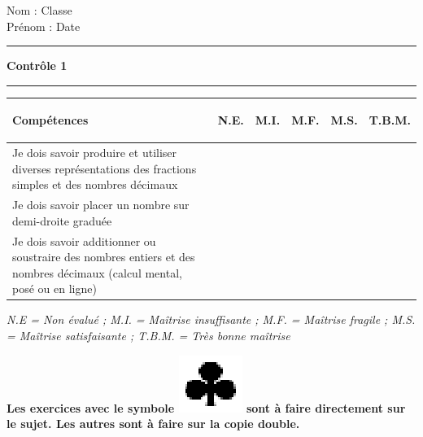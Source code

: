 \documentclass[a4paper,11pt]{article}
\newcommand{\titre}[5] 
{
\noindent #2 \hfill #4 \\
#3 \hfill #5

\vspace{-1.6cm}

\begin{center}\rule{6cm}{0.5mm}\end{center}
\vspace{0.2cm}
\begin{center}{\large{\textbf{#1}}}\end{center}
\begin{center}\rule{6cm}{0.5mm}\end{center}
}
\begin{document}
\pagestyle{empty}
\titre{Contrôle 1  }{Nom :}{Prénom :}{Classe}{Date}


\vspace*{0.25cm}
\begin{flushleft}
\begin{tabular}{|m{9.5cm}|m{1.25cm}|m{1.25cm}|m{1.25cm}|m{1.25cm}|m{1.25cm}|}
\hline 
\textbf{Compétences} & \begin{center}
\textbf{N.E.}
\end{center} & \begin{center}
\textbf{M.I.}
\end{center} & \begin{center}
\textbf{M.F.}
\end{center}  & \begin{center}
\textbf{M.S.}
\end{center} & \begin{center}
\textbf{T.B.M.}
\end{center} \\ 
\hline 
Je dois savoir produire et utiliser diverses représentations des fractions simples et des nombres décimaux &  &  & & &\\
\hline 
Je dois savoir placer un nombre sur demi-droite graduée &  &  & & &\\
\hline 
Je dois savoir additionner ou soustraire des nombres entiers et des nombres décimaux (calcul mental, posé ou en ligne) &  &  & & &\\
\hline


\end{tabular} 
\end{flushleft}

\textit{N.E = Non évalué ; M.I. = Maîtrise insuffisante ; M.F. = Maîtrise fragile ; M.S. = Maîtrise satisfaisante ; T.B.M. = Très bonne maîtrise}\\




\vspace*{0.15cm}


\textbf{Les exercices avec le symbole \includegraphics[scale=0.4]{trefle.eps} sont à faire directement sur le sujet. Les autres sont à faire sur la copie double.}\\
\end{document}
